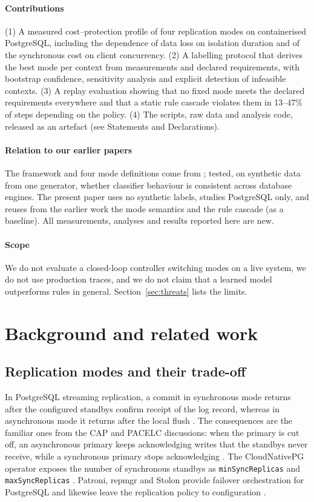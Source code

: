 \documentclass[smallextended]{svjour3}
\begin{document}
\paragraph{Contributions}
(1) A measured cost--protection profile of four replication modes on containerised PostgreSQL, including the dependence of data loss on isolation duration and of the synchronous cost on client concurrency. (2) A labelling protocol that derives the best mode per context from measurements and declared requirements, with bootstrap confidence, sensitivity analysis and explicit detection of infeasible contexts. (3) A replay evaluation showing that no fixed mode meets the declared requirements everywhere and that a static rule cascade violates them in 13--47\% of steps depending on the policy. (4) The scripts, raw data and analysis code, released as an artefact (see Statements and Declarations).

\paragraph{Relation to our earlier papers}
The framework and four mode definitions come from \cite{jerrari2026iaha}; \cite{jerrari2026cross} tested, on synthetic data from one generator, whether classifier behaviour is consistent across database engines. The present paper uses no synthetic labels, studies PostgreSQL only, and reuses from the earlier work the mode semantics and the rule cascade (as a baseline). All measurements, analyses and results reported here are new.

\paragraph{Scope}
We do not evaluate a closed-loop controller switching modes on a live system, we do not use production traces, and we do not claim that a learned model outperforms rules in general. Section~\ref{sec:threats} lists the limits.

\section{Background and related work}\label{sec:related}
\subsection{Replication modes and their trade-off}
In PostgreSQL streaming replication, a commit in synchronous mode returns after the configured standbys confirm receipt of the log record, whereas in asynchronous mode it returns after the local flush \cite{pgdocs}. The consequences are the familiar ones from the CAP and PACELC discussions: when the primary is cut off, an asynchronous primary keeps acknowledging writes that the standbys never receive, while a synchronous primary stops acknowledging \cite{gilbert2002,abadi2012}. The CloudNativePG operator exposes the number of synchronous standbys as \texttt{minSyncReplicas} and \texttt{maxSyncReplicas} \cite{cnpg}. Patroni, repmgr and Stolon provide failover orchestration for PostgreSQL and likewise leave the replication policy to configuration \cite{patroni,repmgr,stolon}.
\end{document}

